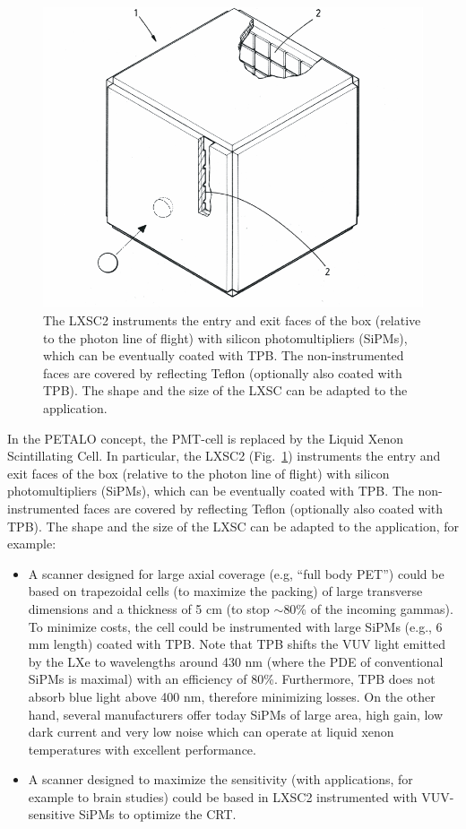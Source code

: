 \documentclass[review]{elsarticle}
\begin{document}
\begin{figure}[!htbp]
	\centering
	\includegraphics[scale=0.6]{../img/LXSC2.pdf}
	\caption{\label{fig.box} The LXSC2 instruments the entry and exit faces of the box (relative to the photon line of flight) with silicon photomultipliers (SiPMs), which can be eventually coated with TPB. The non-instrumented faces are covered by reflecting Teflon (optionally also coated with TPB). The shape and the size of the LXSC can be adapted to the application.}
\end{figure}

In the PETALO concept, the PMT-cell is replaced by the Liquid Xenon Scintillating Cell. In particular, the LXSC2 (Fig.~\ref{fig.box}) instruments the entry and exit faces of the box (relative to the photon line of flight) with silicon photomultipliers (SiPMs), which can be eventually coated with TPB. The non-instrumented faces are covered by reflecting Teflon (optionally also coated with TPB). The shape and the size of the LXSC can be adapted to the application, for example:
\begin{itemize}
\item A scanner designed for large axial coverage (e.g, ``full body PET'') could be based on trapezoidal cells (to maximize the packing) of large transverse dimensions and a thickness of 5 cm (to stop $\sim$80\% of the incoming gammas). To minimize costs, the cell could be instrumented with large
SiPMs (e.g., 6 mm length) coated with TPB.  Note that TPB shifts the VUV light emitted by the LXe  to wavelengths around 430 nm (where the PDE of conventional SiPMs is maximal) with an efficiency of 
80\%. Furthermore, TPB does not absorb blue light above 400 nm, therefore minimizing losses. On the other hand, several manufacturers offer today SiPMs of large area, high gain, low dark current and very low noise which can operate at liquid xenon temperatures with excellent performance.
\item A scanner designed to maximize the sensitivity (with applications, for example
to brain studies) could be based in LXSC2 instrumented with VUV-sensitive SiPMs to optimize the CRT. 
\end{itemize}
\end{document}
